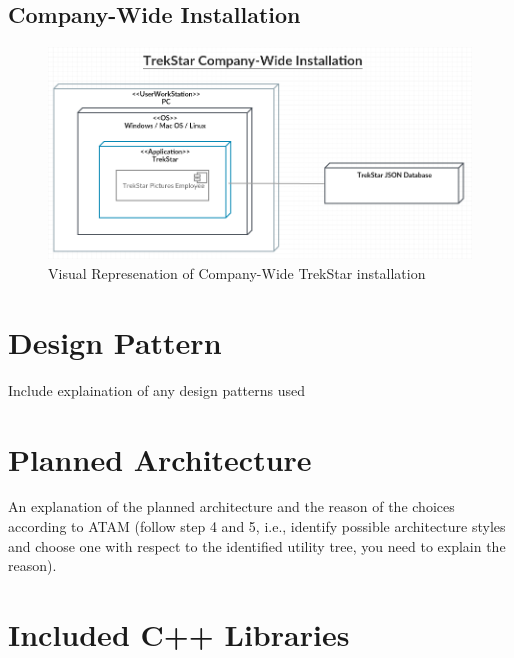 \documentclass[
  english,
  a4paper,
,tablecaptionabove
]{scrartcl}
\begin{document}
\hypertarget{company-wide-installation}{%
\subsection{Company-Wide Installation}\label{company-wide-installation}}

\begin{figure}
\centering
\includegraphics{deployment-diagrams/trekstar-company-installation.png}
\caption{Visual Represenation of Company-Wide TrekStar installation}
\end{figure}

\newpage

\hypertarget{design-pattern}{%
\section{Design Pattern}\label{design-pattern}}

Include explaination of any design patterns used

\newpage

\hypertarget{planned-architecture}{%
\section{Planned Architecture}\label{planned-architecture}}

An explanation of the planned architecture and the reason of the choices
according to ATAM (follow step 4 and 5, i.e., identify possible
architecture styles and choose one with respect to the identified
utility tree, you need to explain the reason).

\newpage

\hypertarget{included-c-libraries}{%
\section{Included C++ Libraries}\label{included-c-libraries}}
\end{document}
